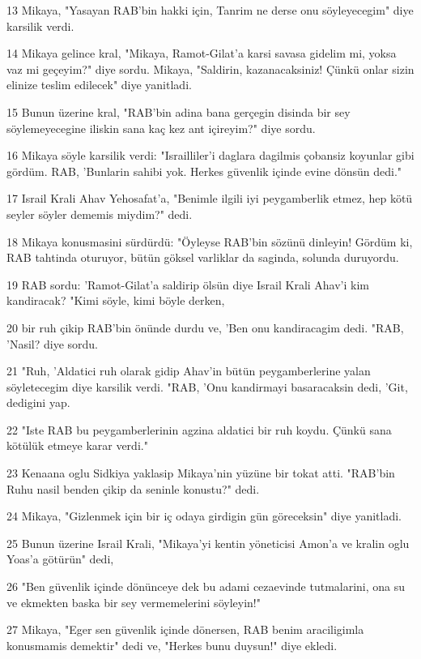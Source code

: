 \par 13 Mikaya, "Yasayan RAB'bin hakki için, Tanrim ne derse onu söyleyecegim" diye karsilik verdi.
\par 14 Mikaya gelince kral, "Mikaya, Ramot-Gilat'a karsi savasa gidelim mi, yoksa vaz mi geçeyim?" diye sordu. Mikaya, "Saldirin, kazanacaksiniz! Çünkü onlar sizin elinize teslim edilecek" diye yanitladi.
\par 15 Bunun üzerine kral, "RAB'bin adina bana gerçegin disinda bir sey söylemeyecegine iliskin sana kaç kez ant içireyim?" diye sordu.
\par 16 Mikaya söyle karsilik verdi: "Israilliler'i daglara dagilmis çobansiz koyunlar gibi gördüm. RAB, 'Bunlarin sahibi yok. Herkes güvenlik içinde evine dönsün dedi."
\par 17 Israil Krali Ahav Yehosafat'a, "Benimle ilgili iyi peygamberlik etmez, hep kötü seyler söyler dememis miydim?" dedi.
\par 18 Mikaya konusmasini sürdürdü: "Öyleyse RAB'bin sözünü dinleyin! Gördüm ki, RAB tahtinda oturuyor, bütün göksel varliklar da saginda, solunda duruyordu.
\par 19 RAB sordu: 'Ramot-Gilat'a saldirip ölsün diye Israil Krali Ahav'i kim kandiracak? "Kimi söyle, kimi böyle derken,
\par 20 bir ruh çikip RAB'bin önünde durdu ve, 'Ben onu kandiracagim dedi. "RAB, 'Nasil? diye sordu.
\par 21 "Ruh, 'Aldatici ruh olarak gidip Ahav'in bütün peygamberlerine yalan söyletecegim diye karsilik verdi. "RAB, 'Onu kandirmayi basaracaksin dedi, 'Git, dedigini yap.
\par 22 "Iste RAB bu peygamberlerinin agzina aldatici bir ruh koydu. Çünkü sana kötülük etmeye karar verdi."
\par 23 Kenaana oglu Sidkiya yaklasip Mikaya'nin yüzüne bir tokat atti. "RAB'bin Ruhu nasil benden çikip da seninle konustu?" dedi.
\par 24 Mikaya, "Gizlenmek için bir iç odaya girdigin gün göreceksin" diye yanitladi.
\par 25 Bunun üzerine Israil Krali, "Mikaya'yi kentin yöneticisi Amon'a ve kralin oglu Yoas'a götürün" dedi,
\par 26 "Ben güvenlik içinde dönünceye dek bu adami cezaevinde tutmalarini, ona su ve ekmekten baska bir sey vermemelerini söyleyin!"
\par 27 Mikaya, "Eger sen güvenlik içinde dönersen, RAB benim araciligimla konusmamis demektir" dedi ve, "Herkes bunu duysun!" diye ekledi.
